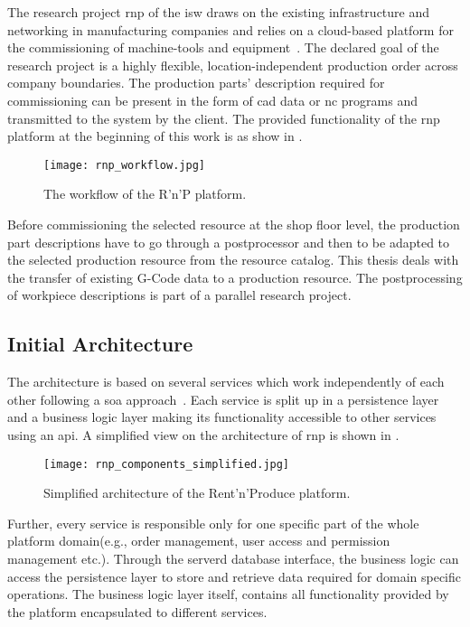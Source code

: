 \documentclass[
a4paper,
twoside,
headsepline,
cleardoublepage=empty,
parskip=half,
draft=false
]{scrbook}
\begin{document}
			The research project \gls{rnp} of the \gls{isw} draws on the existing infrastructure and networking in manufacturing companies and relies on a cloud-based platform for the commissioning of machine-tools and equipment~\cite{xen.17b}. The declared goal of the research project is a highly flexible, location-independent production order across company boundaries. The production parts' description required for commissioning can be present in the form of \gls{cad} data or \gls{nc} programs and transmitted to the system by the client. 
			The provided functionality of the \gls{rnp} platform at the beginning of this work is as show in .
			
			\begin{figure}[htbp]
				\centering
				\texttt{[image: rnp\_workflow.jpg]}
				\caption{The workflow of the R'n'P platform.}
				\label{fig:rnp_workflow}
			\end{figure}
			
			Before commissioning the selected resource at the shop floor level, the production part descriptions have to go through a postprocessor and then to be adapted to the selected production resource from the resource catalog.
			This thesis deals with the transfer of existing G-Code data to a production resource. 
			The postprocessing of workpiece descriptions is part of a parallel research project.
			
			\subsection{Initial Architecture}\label{subsec:initial_architecture}
			
			The architecture is based on several services which work independently of each other following a \gls{soa} approach~\cite{erl2008soa}. 
			Each service is split up in a persistence layer and a business logic layer making its functionality accessible to other services using an \gls{api}.
			A simplified view on the architecture of \gls{rnp} is shown in .
			
			\begin{figure}[htbp]
				\centering
				\texttt{[image: rnp\_components\_simplified.jpg]}
				\caption{Simplified architecture of the Rent'n'Produce platform.}
				\label{fig:rnp_architecture}
			\end{figure}
			
			Further, every service is responsible only for one specific part of the whole platform domain(e.g., order management, user access and permission management etc.).
			Through the serverd database interface, the business logic can access the persistence layer to store and retrieve data required for domain specific operations.
			The business logic layer itself, contains all functionality provided by the platform encapsulated to different services.
			
\end{document}
